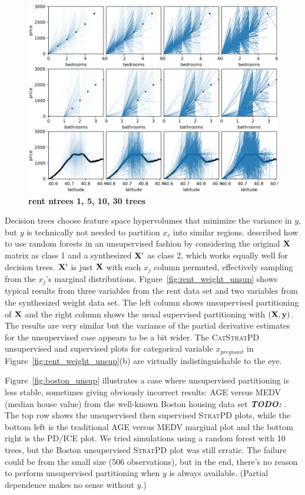 \documentclass[12pt]{article}
\newcommand{\figref}[1]{Figure~\ref{#1}}
\newcommand{\todo}[1]{{\bf\em TODO:} {{\color{red}{#1}}}}
\newcommand{\spd}{\fontfamily{cmr}\textsc{\small StratPD}}
\newcommand{\cspd}{\fontfamily{cmr}\textsc{\small CatStratPD}}
\newcommand{\xnc}{$x_{\overline{c}}$}
\begin{document}
\begin{figure}[htbp]
\begin{center}
\includegraphics[scale=0.5]{images/rent_ntrees.png}
\caption{{\bf  rent ntrees 1, 5, 10, 30 trees}}
\label{fig:rent_ntrees}
\end{center}
\end{figure}

Decision trees choose feature space hypervolumes that minimize the variance in $y$, but $y$ is technically not needed to partition \xnc{} into similar regions. \cite{RFunsup} described how to use random forests in an unsupervised fashion by considering the original $\bf X$ matrix as class 1 and a synthesized $\bf X'$ as class 2, which works equally well for decision trees. $\bf X'$ is just $\bf X$ with each $x_j$ column permuted, effectively sampling from the $x_j$'s marginal distributions. \figref{fig:rent_weight_unsup} shows typical results from three variables from the rent data set and two variables from the synthesized weight data set.  The left column shows unsupervised partitioning of $\bf X$ and the right column shows the usual supervised partitioning with $(\bf X, y)$. The results are very similar but the variance of the partial derivative estimates for the unsupervised case appears to be a bit wider. The \cspd{} unsupervised and supervised plots for categorical variable $x_{pregnant}$ in \figref{fig:rent_weight_unsup}(b) are virtually indistinguishable to the eye. 

\figref{fig:boston_unsup} illustrates a case where unsupervised partitioning is less stable, sometimes giving obviously incorrect results: AGE versus MEDV (median house value) from the well-known Boston housing data set \todo{ref ICE's use in their paper}. The top row shows the unsupervised then supervised \spd{} plots, while the bottom left is the traditional AGE versus MEDV marginal plot and the bottom right is the PD/ICE plot. We tried simulations using a random forest with 10 trees, but the Boston unsupervised \spd{} plot was still erratic. The failure could be from the small size (506 observations), but in the end, there's no reason to perform unsupervised partitioning when $y$ is always available. (Partial dependence makes no sense without $y$.) 
\end{document}
